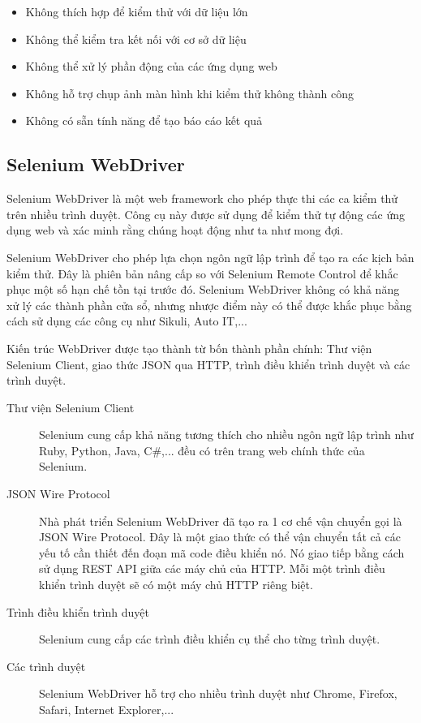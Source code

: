 \documentclass[./../main_file.tex]{subfiles}
\begin{document}
	\begin{itemize}
		\item Không thích hợp để kiểm thử với dữ liệu lớn
		\item Không thể kiểm tra kết nối với cơ sở dữ liệu
		\item Không thể xử lý phần động của các ứng dụng web
		\item Không hỗ trợ chụp ảnh màn hình khi kiểm thử không thành công
		\item Không có sẵn tính năng để tạo báo cáo kết quả
	\end{itemize}
	
	\subsection{Selenium WebDriver}
	
	Selenium WebDriver là một web framework cho phép thực thi các ca kiểm thử trên nhiều trình duyệt. Công cụ này được sử dụng để kiểm thử tự động các ứng dụng web và  xác minh rằng chúng hoạt động như ta như mong đợi.
	
	Selenium WebDriver cho phép lựa chọn ngôn ngữ lập trình để tạo ra các kịch bản kiểm thử. Đây là phiên bản nâng cấp so với Selenium Remote Control để khắc phục một số hạn chế tồn tại trước đó. Selenium WebDriver không có khả năng xử lý các thành phần cửa sổ, nhưng nhược điểm này có thể được khắc phục bằng cách sử dụng các công cụ như Sikuli, Auto IT,...
	
	Kiến trúc WebDriver được tạo thành từ bốn thành phần chính: Thư viện Selenium Client, giao thức JSON qua HTTP, trình điều khiển trình duyệt và các trình duyệt.

	\begin{description}
		\item[Thư viện Selenium Client] Selenium cung cấp khả năng tương thích cho nhiều ngôn ngữ lập trình như Ruby, Python, Java, C\#,... đều có trên trang web chính thức của Selenium.
		\item[JSON Wire Protocol] Nhà phát triển Selenium WebDriver đã tạo ra 1 cơ chế vận chuyển gọi là JSON Wire Protocol. Đây là một giao thức có thể vận chuyển tất cả các yếu tố cần thiết đến đoạn mã code điều khiển nó. Nó giao tiếp bằng cách sử dụng REST API giữa các máy chủ của HTTP. Mỗi một trình điều khiển trình duyệt sẽ có một máy chủ HTTP riêng biệt.
		\item[Trình điều khiển trình duyệt] Selenium cung cấp các trình điều khiển cụ thể cho từng trình duyệt.
		\item[Các trình duyệt] Selenium WebDriver hỗ trợ cho nhiều trình duyệt như Chrome, Firefox, Safari, Internet Explorer,...
	\end{description}
\end{document}
